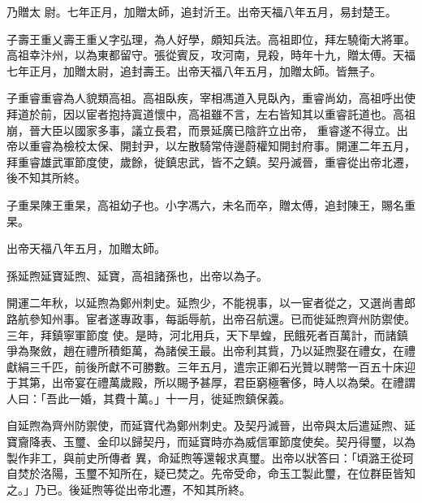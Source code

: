 \begin{pinyinscope}
 乃贈太
 尉。七年正月，加贈太師，追封沂王。出帝天福八年五月，易封楚王。



 子壽王重乂壽王重乂字弘理，為人好學，頗知兵法。高祖即位，拜左驍衛大將軍。高祖幸汴州，以為東都留守。張從賓反，攻河南，見殺，時年十九，贈太傅。天福七年正月，加贈太尉，追封壽王。出帝天福八年五月，加贈太師。皆無子。



 子重睿重睿為人貌類高祖。高祖臥疾，宰相馮道入見臥內，重睿尚幼，高祖呼出使拜道於前，因以宦者抱持寘道懷中，高祖雖不言，左右皆知其以重睿託道也。高祖崩，晉大臣以國家多事，議立長君，而景延廣已陰許立出帝，
 重睿遂不得立。出帝以重睿為檢校太保、開封尹，以左散騎常侍邊蔚權知開封府事。開運二年五月，拜重睿雄武軍節度使，歲餘，徙鎮忠武，皆不之鎮。契丹滅晉，重睿從出帝北遷，後不知其所終。



 子重杲陳王重杲，高祖幼子也。小字馮六，未名而卒，贈太傅，追封陳王，賜名重杲。



 出帝天福八年五月，加贈太師。



 孫延煦延寶延煦、延寶，高祖諸孫也，出帝以為子。



 開運二年秋，以延煦為鄭州刺史。延煦少，不能視事，以一宦者從之，又選尚書郎路航參知州事。宦者遂專政事，每詬辱航，出帝召航還。已而徙延煦齊州防禦使。三年，拜鎮寧軍節度
 使。是時，河北用兵，天下旱蝗，民餓死者百萬計，而諸鎮爭為聚斂，趙在禮所積鉅萬，為諸侯王最。出帝利其貲，乃以延煦娶在禮女，在禮獻絹三千匹，前後所獻不可勝數。三年五月，遣宗正卿石光贊以聘幣一百五十床迎于其第，出帝宴在禮萬歲殿，所以賜予甚厚，君臣窮極奢侈，時人以為榮。在禮謂人曰：「吾此一婚，其費十萬。」十一月，徙延煦鎮保義。



 自延煦為齊州防禦使，而延寶代為鄭州刺史。及契丹滅晉，出帝與太后遣延煦、延寶齎降表、玉璽、金印以歸契丹，而延寶時亦為威信軍節度使矣。契丹得璽，以為製作非工，與前史所傳者
 異，命延煦等還報求真璽。出帝以狀答曰：「頃潞王從珂自焚於洛陽，玉璽不知所在，疑已焚之。先帝受命，命玉工製此璽，在位群臣皆知之。」乃已。後延煦等從出帝北遷，不知其所終。




\end{pinyinscope}
